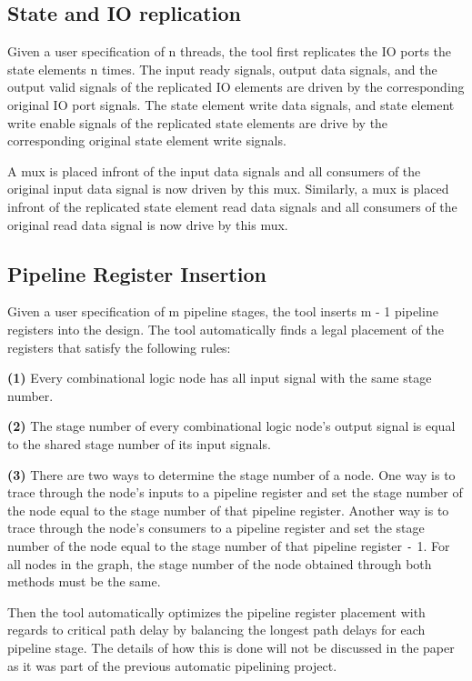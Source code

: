 \subsection{State and IO replication}
\label{sec:replication}
Given a user specification of n threads, the tool first replicates the IO ports the state elements n times. The input ready signals, output data signals, and the output valid signals of the replicated IO elements are driven by the corresponding original IO port signals. The state element write data signals, and state element write enable signals of the replicated state elements are drive by the corresponding original state element write signals. 

A mux is placed infront of the input data signals and all consumers of the original input data signal is now driven by this mux. Similarly, a mux is placed infront of the replicated state element read data signals and all consumers of the original read data signal is now drive by this mux.

\subsection{Pipeline Register Insertion}
Given a user specification of m pipeline stages, the tool inserts m - 1 pipeline registers into the design. The tool automatically finds a legal placement of the registers that satisfy the following rules:

{\bf (1)} Every combinational logic node has all input signal with the same stage number.  

{\bf (2)} The stage number of every combinational logic node's output signal is equal to the shared stage number of its input signals.

{\bf (3)} There are two ways to determine the stage number of a node. One way is to trace through the node's inputs to a pipeline register and set the stage number of the node equal to the stage number of that pipeline register. Another way is to trace through the node’s consumers to a pipeline register and set the stage number of the node equal to the stage number of that pipeline register {\tt -}  1. For all nodes in the graph, the stage number of the node obtained through both methods must be the same.

Then the tool automatically optimizes the pipeline register placement with regards to critical path delay by balancing the longest path delays for each pipeline stage. The details of how this is done will not be discussed in the paper as it was part of the previous automatic pipelining project.

